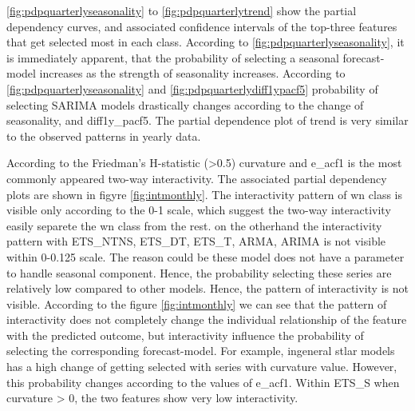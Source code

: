 \documentclass[11pt,a4paper,]{article}
\begin{document}
\autoref{fig:pdpquarterlyseasonality} to \autoref{fig:pdpquarterlytrend} show the partial dependency curves, and associated confidence intervals of the top-three features that get selected most in each class. According to \autoref{fig:pdpquarterlyseasonality}, it is immediately apparent, that the probability of selecting a seasonal forecast-model increases as the strength of seasonality increases. According to \autoref{fig:pdpquarterlyseasonality} and \autoref{fig:pdpquarterlydiff1ypacf5} probability of selecting SARIMA models drastically changes according to the change of seasonality, and diff1y\_pacf5. The partial dependence plot of trend is very similar to the observed patterns in yearly data.

According to the Friedman's H-statistic (\textgreater{}0.5) curvature and e\_acf1 is the most commonly appeared two-way interactivity. The associated partial dependency plots are shown in figyre \autoref{fig:intmonthly}. The interactivity pattern of wn class is visible only according to the 0-1 scale, which suggest the two-way interactivity easily separete the wn class from the rest. on the otherhand the interactivity pattern with ETS\_NTNS, ETS\_DT, ETS\_T, ARMA, ARIMA is not visible within 0-0.125 scale. The reason could be these model does not have a parameter to handle seasonal component. Hence, the probability selecting these series are relatively low compared to other models. Hence, the pattern of interactivity is not visible. According to the figure \autoref{fig:intmonthly} we can see that the pattern of interactivity does not completely change the individual relationship of the feature with the predicted outcome, but interactivity influence the probability of selecting the corresponding forecast-model. For example, ingeneral stlar models has a high change of getting selected with series with curvature value. However, this probability changes according to the values of e\_acf1. Within ETS\_S when curvature \textgreater{} 0, the two features show very low interactivity.
\end{document}
